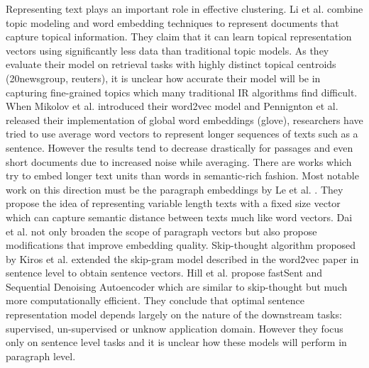 \documentclass[sigconf,authordraft]{acmart}
\begin{document}
Representing text plays an important role in effective clustering. Li et al. \cite{li2016generative} combine topic modeling and word embedding techniques to represent documents that capture topical information. They claim that it can learn topical representation vectors using significantly less data than traditional topic models. As they evaluate their model on retrieval tasks with highly distinct topical centroids (20newsgroup, reuters), it is unclear how accurate their model will be in capturing fine-grained topics which many traditional IR algorithms find difficult. When Mikolov et al. \cite{mikolov2013distributed} introduced their word2vec model and Pennignton et al. \cite{pennington2014glove} released their implementation of global word embeddings (glove), researchers have tried to use average word vectors to represent longer sequences of texts such as a sentence. However the results tend to decrease drastically for passages and even short documents due to increased noise while averaging. There are works which try to embed longer text units than words in semantic-rich fashion. Most notable work on this direction must be the paragraph embeddings by Le et al. \cite{le2014distributed}. They propose the idea of representing variable length texts with a fixed size vector which can capture semantic distance between texts much like word vectors. Dai et al. \cite{dai2015document} not only broaden the scope of paragraph vectors but also propose modifications that improve embedding quality. Skip-thought algorithm proposed by Kiros et al. \cite{kiros2015skip} extended the skip-gram model described in the word2vec paper in sentence level to obtain sentence vectors. Hill et al. \cite{hill2016learning} propose fastSent and Sequential Denoising Autoencoder which are similar to skip-thought but much more computationally efficient. They conclude that optimal sentence representation model depends largely on the nature of the downstream tasks: supervised, un-supervised or unknow application domain. However they focus only on sentence level tasks and it is unclear how these models will perform in paragraph level. 
\end{document}
